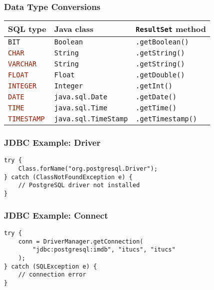 \documentclass[dvipsnames]{beamer}
\theoremstyle{plain}
\begin{document}
\begin{frame}
  \frametitle{Data Type Conversions}

  \begin{table}
    \begin{tabular}{|l|l|l|}\hline
SQL type                            & Java class
                                    & \lstinline!ResultSet! method\\\hline\hline
\lstinline[language=SQL]!BIT!       & \lstinline!Boolean!
                                    & \lstinline!.getBoolean()!    \\\hline
\lstinline[language=SQL]!CHAR!      & \lstinline!String!
                                    & \lstinline!.getString()!     \\\hline
\lstinline[language=SQL]!VARCHAR!   & \lstinline!String!
                                    & \lstinline!.getString()!     \\\hline
\lstinline[language=SQL]!FLOAT!     & \lstinline!Float!
                                    & \lstinline!.getDouble()!     \\\hline
\lstinline[language=SQL]!INTEGER!   & \lstinline!Integer!
                                    & \lstinline!.getInt()!        \\\hline
\lstinline[language=SQL]!DATE!      & \lstinline!java.sql.Date!
                                    & \lstinline!.getDate()!       \\\hline
\lstinline[language=SQL]!TIME!      & \lstinline!java.sql.Time!
                                    & \lstinline!.getTime()!       \\\hline
\lstinline[language=SQL]!TIMESTAMP! & \lstinline!java.sql.TimeStamp!
                                    & \lstinline!.getTimestamp()!  \\\hline
    \end{tabular}
  \end{table}
\end{frame}

\begin{frame}[fragile]
  \frametitle{JDBC Example: Driver}

  \begin{lstlisting}
try {
    Class.forName("org.postgresql.Driver");
} catch (ClassNotFoundException e) {
    // PostgreSQL driver not installed
}
  \end{lstlisting}
\end{frame}

\begin{frame}[fragile]
  \frametitle{JDBC Example: Connect}

  \begin{lstlisting}
try {
    conn = DriverManager.getConnection(
        "jdbc:postgresql:imdb", "itucs", "itucs"
    );
} catch (SQLException e) {
    // connection error
}
  \end{lstlisting}
\end{frame}
\end{document}
